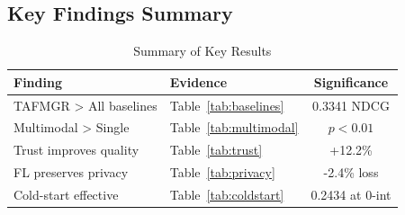 \subsection{Key Findings Summary}

\begin{table}[h]
\centering
\small
\caption{Summary of Key Results}
\label{tab:summary}
\begin{tabular}{llc}
\toprule
\textbf{Finding} & \textbf{Evidence} & \textbf{Significance} \\
\midrule
TAFMGR > All baselines & Table~\ref{tab:baselines} & 0.3341 NDCG \\
Multimodal > Single & Table~\ref{tab:multimodal} & $p<0.01$ \\
Trust improves quality & Table~\ref{tab:trust} & +12.2\% \\
FL preserves privacy & Table~\ref{tab:privacy} & -2.4\% loss \\
Cold-start effective & Table~\ref{tab:coldstart} & 0.2434 at 0-int \\
\bottomrule
\end{tabular}
\end{table}

